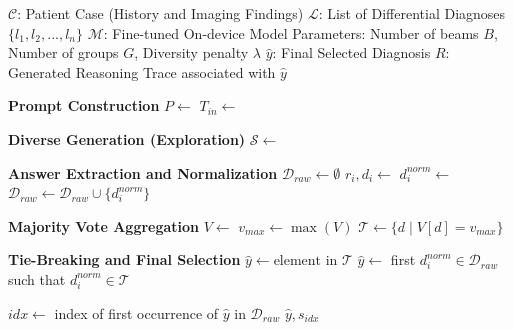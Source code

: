 \documentclass[10pt,journal,compsoc, onecolumn]{IEEEtran}
\begin{document}
\begin{algorithm}[H] %
\caption{Inference protocol for robust diagnostic reasoning.
The algorithm employs diverse group beam search to generate multiple independent reasoning paths ($B$ beams, $G$ groups), followed by majority-vote aggregation to mitigate hallucination and select the most consensus-driven diagnosis.}
\label{alg:inference_workflow}
\begin{algorithmic}[1]
\Require 
    \State $\mathcal{C}$: Patient Case (History and Imaging Findings)
    \State $\mathcal{L}$: List of Differential Diagnoses $\{l_1, l_2, ..., l_n\}$
    \State $\mathcal{M}$: Fine-tuned On-device Model
    \State Parameters: Number of beams $B$, Number of groups $G$, Diversity penalty $\lambda$
\Ensure 
    \State $\hat{y}$: Final Selected Diagnosis
    \State $R$: Generated Reasoning Trace associated with $\hat{y}$

\Statex
\State \textbf{Prompt Construction}
\State $P \leftarrow$  
\State $T_{in} \leftarrow$ 

\Statex
\State \textbf{Diverse Generation (Exploration)}
\State $\mathcal{S} \leftarrow$ 
\State {}

\Statex
\State \textbf{Answer Extraction and Normalization}
\State $\mathcal{D}_{raw} \leftarrow \emptyset$ 
    \State $r_i, d_i \leftarrow$  
    \State $d_i^{norm} \leftarrow$  
    \State $\mathcal{D}_{raw} \leftarrow \mathcal{D}_{raw} \cup \{d_i^{norm}\}$
\EndFor

\Statex
\State \textbf{Majority Vote Aggregation}
\State $V \leftarrow$  
\State $v_{max} \leftarrow \max(V)$
\State $\mathcal{T} \leftarrow \{d \mid V[d] = v_{max}\}$ 

\Statex
\State \textbf{Tie-Breaking and Final Selection}
    \State $\hat{y} \leftarrow \text{element in } \mathcal{T}$
\Else
    \State {}
    \State $\hat{y} \leftarrow$ first $d_i^{norm} \in \mathcal{D}_{raw}$ such that $d_i^{norm} \in \mathcal{T}$
\EndIf

\State $idx \leftarrow$ index of first occurrence of $\hat{y}$ in $\mathcal{D}_{raw}$
\State \Return $\hat{y}, s_{idx}$

\end{algorithmic}
\end{algorithm}
\end{document}
